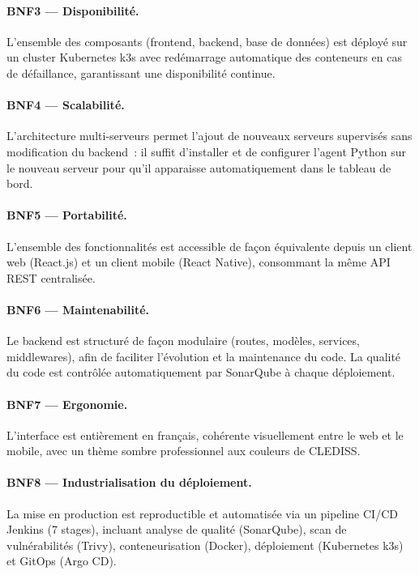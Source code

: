 \paragraph{BNF3 --- Disponibilité.} L'ensemble des composants (frontend, backend, base de données) est déployé sur un cluster Kubernetes k3s avec redémarrage automatique des conteneurs en cas de défaillance, garantissant une disponibilité continue.

\paragraph{BNF4 --- Scalabilité.} L'architecture multi-serveurs permet l'ajout de nouveaux serveurs supervisés sans modification du backend~: il suffit d'installer et de configurer l'agent Python sur le nouveau serveur pour qu'il apparaisse automatiquement dans le tableau de bord.

\paragraph{BNF5 --- Portabilité.} L'ensemble des fonctionnalités est accessible de façon équivalente depuis un client web (React.js) et un client mobile (React Native), consommant la même API REST centralisée.

\paragraph{BNF6 --- Maintenabilité.} Le backend est structuré de façon modulaire (routes, modèles, services, middlewares), afin de faciliter l'évolution et la maintenance du code. La qualité du code est contrôlée automatiquement par SonarQube à chaque déploiement.

\paragraph{BNF7 --- Ergonomie.} L'interface est entièrement en français, cohérente visuellement entre le web et le mobile, avec un thème sombre professionnel aux couleurs de CLEDISS.

\paragraph{BNF8 --- Industrialisation du déploiement.} La mise en production est reproductible et automatisée via un pipeline CI/CD Jenkins (7 stages), incluant analyse de qualité (SonarQube), scan de vulnérabilités (Trivy), conteneurisation (Docker), déploiement (Kubernetes k3s) et GitOps (Argo CD).

